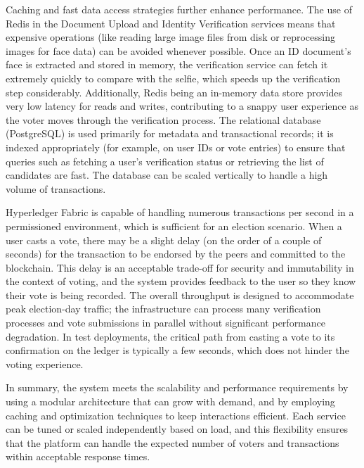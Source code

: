 \documentclass[a4paper,10pt]{report}
\begin{document}
Caching and fast data access strategies further enhance performance. The use of Redis in the Document Upload and Identity Verification services means that expensive operations (like reading large image files from disk or reprocessing images for face data) can be avoided whenever possible. Once an ID document’s face is extracted and stored in memory, the verification service can fetch it extremely quickly to compare with the selfie, which speeds up the verification step considerably. Additionally, Redis being an in-memory data store provides very low latency for reads and writes, contributing to a snappy user experience as the voter moves through the verification process. The relational database (PostgreSQL) is used primarily for metadata and transactional records; it is indexed appropriately (for example, on user IDs or vote entries) to ensure that queries such as fetching a user’s verification status or retrieving the list of candidates are fast. The database can be scaled vertically to handle a high volume of transactions.

Hyperledger Fabric is capable of handling numerous transactions per second in a permissioned environment, which is sufficient for an election scenario. When a user casts a vote, there may be a slight delay (on the order of a couple of seconds) for the transaction to be endorsed by the peers and committed to the blockchain. This delay is an acceptable trade-off for security and immutability in the context of voting, and the system provides feedback to the user so they know their vote is being recorded. The overall throughput is designed to accommodate peak election-day traffic; the infrastructure can process many verification processes and vote submissions in parallel without significant performance degradation. In test deployments, the critical path from casting a vote to its confirmation on the ledger is typically a few seconds, which does not hinder the voting experience.

In summary, the system meets the scalability and performance requirements by using a modular architecture that can grow with demand, and by employing caching and optimization techniques to keep interactions efficient. Each service can be tuned or scaled independently based on load, and this flexibility ensures that the platform can handle the expected number of voters and transactions within acceptable response times.
\end{document}
